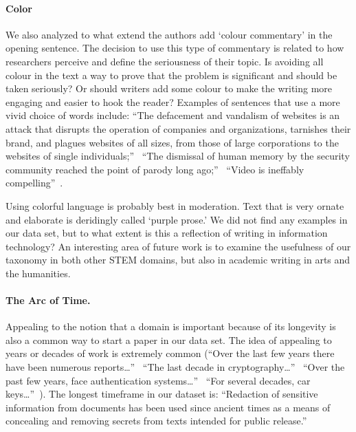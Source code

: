 \documentclass[sigconf,anonymous]{acmart}
\begin{document}
	\paragraph{Color} We also analyzed to what extend the authors add `colour commentary' in the opening sentence. The decision to use this type of commentary is related to how researchers perceive and define the seriousness of their topic. Is avoiding all colour in the text a way to prove that the problem is significant and should be taken seriously? Or should writers add some colour to make the writing more engaging and easier to hook the reader? Examples of sentences that use a more vivid choice of words include: ``The defacement and vandalism of websites is an attack that disrupts the operation of companies and organizations, tarnishes their brand, and plagues websites of all sizes, from those of large corporations to the websites of single individuals;''~\cite{borgolte2015meerkat} ``The dismissal of human memory by the security community reached the point of parody long ago;''~\cite{bonneau2014towards} ``Video is ineffably compelling''~\cite{brocker2014iseeyou}. 
	
	Using colorful language is probably best in moderation. Text that is very ornate and elaborate is deridingly called `purple prose.' We did not find any examples in our data set, but to what extent is this a reflection of writing in information technology? An interesting area of future work is to examine the usefulness of our taxonomy in both other STEM domains, but also in academic writing in arts and the humanities.
	
	\paragraph{The Arc of Time.} Appealing to the notion that a domain is important because of its longevity is also a common way to start a paper in our data set. The idea of appealing to years or decades of work is extremely common (``Over the last few years there have been numerous reports…''~\cite{nakibly2016website} ``The last decade in cryptography…''~\cite{alkim2016post} ``Over the past few years, face authentication systems…''~\cite{xu2016virtual} ``For several decades, car keys…''~\cite{garcia2016lock}). The longest timeframe in our dataset is: ``Redaction of sensitive information from documents has been used since ancient times as a means of concealing and removing secrets from texts intended for public release.''~\cite{araujo2015compiler}
	
\end{document}
